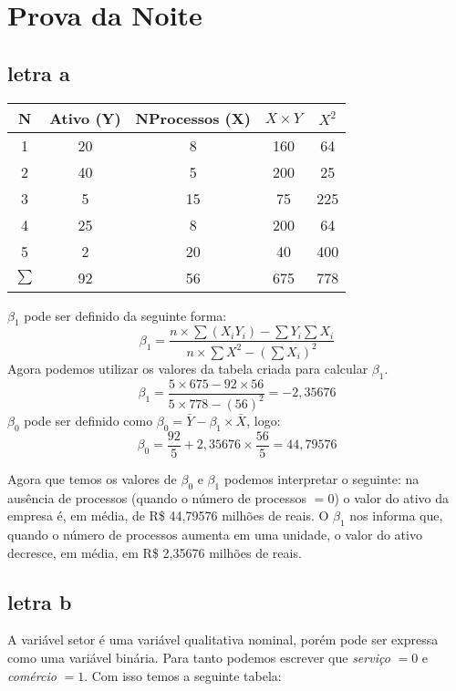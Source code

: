\chapter{Prova da Noite}
\section{letra a}
\begin{center}
    \begin{tabular}{|c|c|c|c|c|}
        \hline
        N & Ativo (Y) & NProcessos (X) & \(X \times Y\) & \(X^2\)  \\ \hline
        1 & 20 & 8 & 160 & 64 \\ \hline
        2 & 40 & 5 & 200 & 25 \\ \hline
        3 & 5 & 15 & 75 & 225 \\ \hline
        4 & 25 & 8 & 200 & 64 \\ \hline
        5 & 2 & 20 & 40 & 400 \\ \hline
        \(\sum\) & 92 & 56 & 675 & 778 \\ \hline
    \end{tabular}
\end{center}
\(\beta_{1}\) pode ser definido da seguinte forma:
\[\beta_{1} = \frac{n \times \sum (X_{i}Y_{i}) - \sum Y_{i}\sum X_{i}}{n \times \sum X^2 - (\sum X_{i})^2}\]
Agora podemos utilizar os valores da tabela criada para calcular \(\beta_{1}\).
\[ \beta_{1} = \frac{5 \times 675 - 92 \times 56}{5 \times 778 - (56)^2} = -2,35676 \]
\(\beta_{0}\) pode ser definido como \(\beta_{0} = \bar{Y} - \beta_{1} \times \bar{X}\), logo:
\[ \beta_{0} = \frac{92}{5} + 2,35676 \times \frac{56}{5} = 44,79576 \]

Agora que temos os valores de \(\beta_{0}\) e \(\beta_{1}\) podemos interpretar o seguinte: na ausência de processos (quando o número de processos \(= 0\)) o valor do ativo da empresa é, em média, de R\$ 44,79576 milhões de reais. O \(\beta_{1}\) nos informa que, quando o número de processos aumenta em uma unidade, o valor do ativo decresce, em média, em R\$ 2,35676 milhões de reais.

\section{letra b}
A variável setor é uma variável qualitativa nominal, porém pode ser expressa como uma variável binária. Para tanto podemos escrever que \textit{serviço} \(= 0\) e \textit{comércio} \(= 1\). Com isso temos a seguinte tabela:

